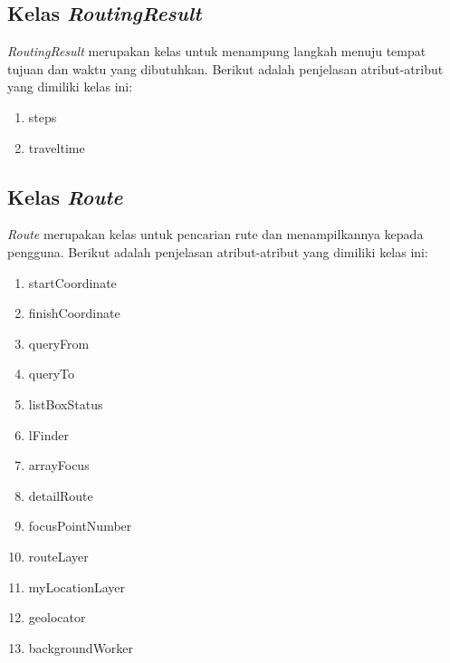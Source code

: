 \subsection{Kelas \textit{RoutingResult}}
\label{lab:Kelas RoutingResult}
\hspace{0.5cm} \textit{RoutingResult} merupakan kelas untuk menampung langkah menuju tempat tujuan dan waktu yang dibutuhkan. Berikut adalah penjelasan atribut-atribut yang dimiliki kelas ini:
\begin{enumerate}
	\item steps
	\item traveltime
\end{enumerate}

\subsection{Kelas \textit{Route}}
\label{lab:Kelas Route}
\hspace{0.5cm} \textit{Route} merupakan kelas untuk pencarian rute dan menampilkannya kepada pengguna. Berikut adalah penjelasan atribut-atribut yang dimiliki kelas ini:
\begin{enumerate}
	\item startCoordinate
	\item finishCoordinate
	\item queryFrom
	\item queryTo
	\item listBoxStatus
	\item lFinder
	\item arrayFocus
	\item detailRoute
	\item focusPointNumber
	\item routeLayer
	\item myLocationLayer
	\item geolocator
	\item backgroundWorker
\end{enumerate}

